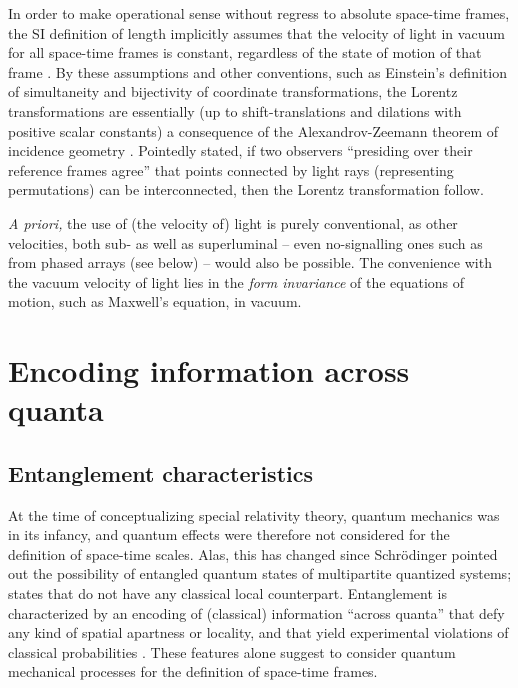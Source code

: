 \documentclass[%
  twocolumn,
 showpacs,
 showkeys,
 preprintnumbers,
 amsmath,amssymb,
 aps,
 prl,
  longbibliography,
 ]{revtex4-1}
\theoremstyle{definition}
\theoremstyle{remark}
\begin{document}
In order to make operational sense without regress to absolute space-time frames,
the SI definition of length implicitly assumes that the velocity of light in vacuum for all space-time frames is constant,
regardless of the state of motion of that frame
\cite{peres-84}.
By these assumptions and other conventions, such as Einstein's definition of simultaneity \cite{ein-05} and bijectivity of coordinate transformations,
the Lorentz transformations are essentially (up to shift-translations and
dilations with positive scalar constants) a consequence
of the Alexandrov-Zeemann theorem of incidence geometry \cite{alex3,zeeman,lester,naber}.
Pointedly stated, if two observers ``presiding over their reference frames agree'' \cite{naber} that points connected by
light rays (representing permutations) can be interconnected, then the Lorentz transformation follow.

{\it A priori,} the use of (the velocity of) light is purely conventional, as other velocities, both sub- as well as superluminal
-- even no-signalling ones such as from phased arrays (see below) --
would also be possible.
The convenience with the vacuum velocity of light lies in the {\em form invariance}
of the equations of motion, such as Maxwell's equation, in vacuum.



\section{Encoding information across quanta}

\subsection{Entanglement characteristics}

At the time of conceptualizing special relativity theory, quantum mechanics was in its infancy,
and quantum effects were therefore not considered for the definition of space-time scales.
Alas, this has changed since Schr\"odinger pointed out the possibility of entangled quantum states of multipartite quantized systems;
states that do not have any classical local counterpart.
Entanglement is characterized by an encoding of (classical) information ``across quanta'' \cite{zeil-99,svozil-2002-statepart-prl}
that defy any kind of spatial apartness or locality,
and that yield experimental violations \cite{wjswz-98} of classical probabilities \cite{pitowsky}.
These features alone suggest to consider quantum mechanical processes for the definition of space-time frames.
\end{document}
